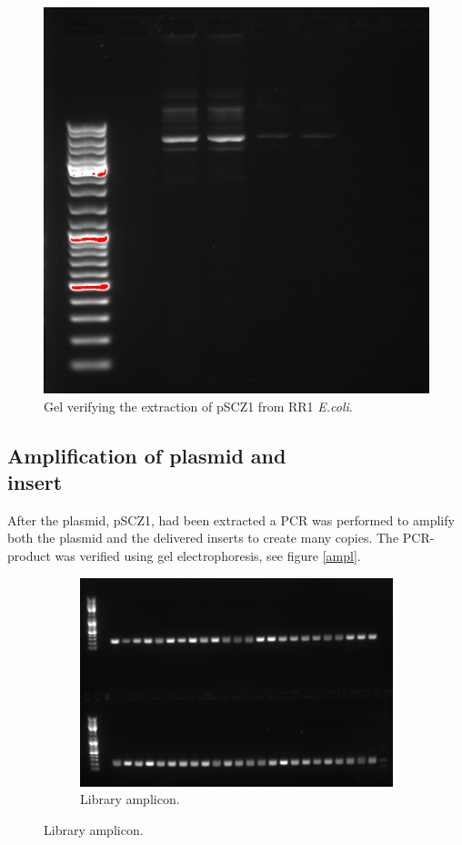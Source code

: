 \documentclass{article}
\begin{document}
\begin{multicols}{2}
	\begin{figure}[H]
		\centering
		\includegraphics[width=0.7\linewidth]{images/pscz1_renad_fr_ecoli.png}
		\caption{Gel verifying the extraction of pSCZ1 from RR1 \textit{E.coli}.}
		\label{pscz1_renad_fr_ecoli}
	\end{figure}
	
	\vfill\null
	\columnbreak
	
	\subsection{Amplification of plasmid and \\insert}
	After the plasmid, pSCZ1, had been extracted a PCR was performed to amplify both the plasmid and the delivered inserts to create many copies. The PCR-product was verified using gel electrophoresis, see figure \ref{ampl}.
	
	\begin{figure}[H]
		\centering
		\begin{subfigure}{0.7\linewidth}
			\includegraphics[width=\linewidth]{images/oligos_efter_PCR.png}
			\caption{Library amplicon.}
		\end{subfigure}
		

\end{figure}
\end{multicols}
\end{document}
